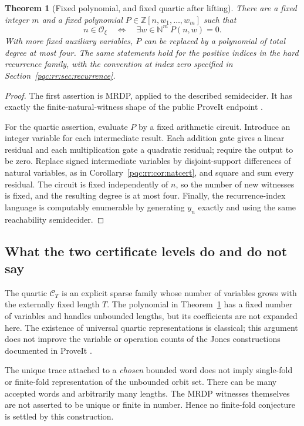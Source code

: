 \documentclass[11pt,letterpaper]{article}
\numberwithin{equation}{section}
\newtheorem{theorem}{Theorem}[section]
\theoremstyle{definition}
\theoremstyle{remark}
\newcommand{\N}{\mathbb N}
\newcommand{\Z}{\mathbb Z}
\begin{document}
\begin{theorem}[Fixed polynomial, and fixed quartic after lifting]
\label{pqc:rr:thm:MRDP}
There are a fixed integer $m$ and a fixed polynomial
$P\in\Z[n,w_1,\ldots,w_m]$ such that
\[
 n\in\mathcal O_\xi
 \quad\Longleftrightarrow\quad
 \exists w\in\N^m\ P(n,w)=0.
\]
With more fixed auxiliary variables, $P$ can be replaced by a polynomial
of total degree at most four. The same statements hold for the positive
indices in the hard recurrence family, with the convention at index zero
specified in Section~\ref{pqc:rr:sec:recurrence}.
\end{theorem}
\begin{proof}
The first assertion is MRDP, applied to the described semidecider. It has
exactly the finite-natural-witness shape of the public ProveIt endpoint
\cite{b62s11-ProveItMRDP}.

For the quartic assertion, evaluate $P$ by a fixed arithmetic circuit.
Introduce an integer variable for each intermediate result. Each
addition gate gives a linear residual and each multiplication gate a
quadratic residual; require the output to be zero. Replace signed
intermediate variables by disjoint-support differences of natural
variables, as in Corollary~\ref{pqc:rr:cor:natcert}, and square and sum every
residual. The circuit is fixed independently of $n$, so the number of
new witnesses is fixed, and the resulting degree is at most four.
Finally, the recurrence-index language is computably enumerable by
generating $y_n$ exactly and using the same reachability semidecider.
\end{proof}

\subsection{What the two certificate levels do and do not say}

The quartic $\mathcal C_T$ is an explicit sparse family whose number of
variables grows with the externally fixed length $T$. The polynomial
in Theorem~\ref{pqc:rr:thm:MRDP} has a fixed number of variables and handles
unbounded lengths, but its coefficients are not expanded here. The
existence of universal quartic representations is classical; this
argument does not improve the variable or operation counts of the Jones
constructions documented in ProveIt \cite{b62s11-ProveItGuide}.

The unique trace attached to a \emph{chosen} bounded word does not imply
single-fold or finite-fold representation of the unbounded orbit set.
There can be many accepted words and arbitrarily many lengths. The
MRDP witnesses themselves are not asserted to be unique or finite in
number. Hence no finite-fold conjecture is settled by this construction.
\end{document}
